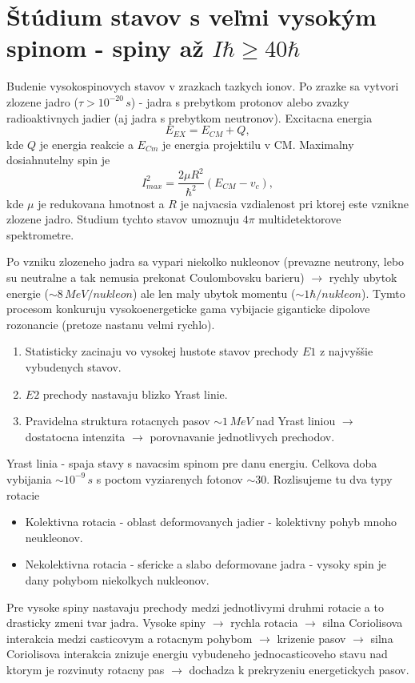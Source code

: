 \documentclass[../../main.tex]{subfiles}
\begin{document}
\section{Štúdium stavov s veľmi vysokým spinom - spiny až $ I\hbar \geq 40\hbar$}
Budenie vysokospinovych stavov v zrazkach tazkych ionov. Po zrazke sa vytvori zlozene jadro ($\tau > 10^{-20}\,s$) - jadra s prebytkom protonov alebo zvazky radioaktivnych jadier (aj jadra s prebytkom neutronov).
Excitacna energia 
$$E_{EX}=E_{CM}+Q,$$ 
kde $Q$ je energia reakcie a $E_{Cm}$ je energia projektilu v CM. Maximalny dosiahnutelny spin je 
$$I^2_{max}=\frac{2\mu R^2}{\hbar^2}(E_{CM}-v_c),$$
kde $\mu$ je redukovana hmotnost a $R$ je najvacsia vzdialenost pri ktorej este vznikne zlozene jadro. Studium tychto stavov umoznuju $4\pi$ multidetektorove spektrometre.\par
Po vzniku zlozeneho jadra sa vypari niekolko nukleonov (prevazne neutrony, lebo su neutralne a tak nemusia prekonat Coulombovsku barieru) $\rightarrow$ rychly ubytok energie ($\sim 8\,MeV/nukleon$) ale len maly ubytok momentu ($\sim 1 \hbar/nukleon$). Tymto procesom konkuruju vysokoenergeticke gama vybijacie giganticke dipolove rozonancie (pretoze nastanu velmi rychlo).\par
\begin{enumerate}
	\item Statisticky zacinaju vo vysokej hustote stavov prechody $E1$ z najvyššie vybudenych stavov.
	\item $E2$ prechody nastavaju blizko Yrast linie.
	\item Pravidelna struktura rotacnych pasov $\sim 1\,MeV$ nad Yrast liniou $\rightarrow$ dostatocna intenzita $\rightarrow$ porovnavanie jednotlivych prechodov.
\end{enumerate}
Yrast linia - spaja stavy s navacsim spinom pre danu energiu. Celkova doba vybijania $\sim 10^{-9}\,s$ s poctom vyziarenych fotonov $\sim 30$. Rozlisujeme tu dva typy rotacie 
\begin{itemize}
	\item Kolektivna rotacia - oblast deformovanych jadier - kolektivny pohyb mnoho neukleonov.
	\item Nekolektivna rotacia - sfericke a slabo deformovane jadra - vysoky spin je dany pohybom niekolkych nukleonov.
\end{itemize}
Pre vysoke spiny nastavaju prechody medzi jednotlivymi druhmi rotacie a to drasticky zmeni tvar jadra. Vysoke spiny $\rightarrow$ rychla rotacia $\rightarrow$ silna Coriolisova interakcia medzi casticovym a rotacnym pohybom $\rightarrow$ krizenie pasov $\rightarrow$ silna Coriolisova interakcia znizuje energiu vybudeneho jednocasticoveho stavu nad ktorym je rozvinuty rotacny pas $\rightarrow$ dochadza k prekryzeniu energetickych pasov.
\end{document}
